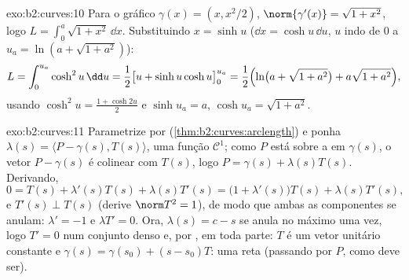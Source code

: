 \begin{solution}{exo:b2:curves:10}
Para o gráfico $\gamma(x) = (x, x^2/2)$, $\norm{\gamma'(x)} =
\sqrt{1 + x^2}$, logo $L = \int_0^a\sqrt{1+x^2}\,\dd x$.
Substituindo $x = \sinh u$ ($\dd x = \cosh u\,\dd u$, $u$ indo
de $0$ a $u_a = \ln(a + \sqrt{1+a^2})$):
\[
L = \int_0^{u_a}\cosh^2 u\,\dd u
= \frac12\bigl[u + \sinh u\cosh u\bigr]_0^{u_a}
= \frac12\Bigl(\ln\bigl(a + \sqrt{1+a^2}\bigr) +
a\sqrt{1+a^2}\Bigr),
\]
usando $\cosh^2 u = \frac{1 + \cosh 2u}2$ e $\sinh u_a = a$,
$\cosh u_a = \sqrt{1 + a^2}$.
\end{solution}

\begin{solution}{exo:b2:curves:11}
Parametrize por 
(\cref{thm:b2:curves:arclength}) e ponha $\lambda(s) =
\langle P - \gamma(s), T(s)\rangle$, uma função
$\mathcal C^1$; como $P$ está sobre a  em $\gamma(s)$,
o vetor $P - \gamma(s)$ é colinear com $T(s)$, logo $P =
\gamma(s) + \lambda(s)T(s)$. Derivando,
\[
0 = T(s) + \lambda'(s)T(s) + \lambda(s)T'(s)
= \bigl(1 + \lambda'(s)\bigr)T(s) + \lambda(s)T'(s),
\]
e $T'(s) \perp T(s)$ (derive $\norm T^2 = 1$), de modo que
ambas as componentes se anulam: $\lambda' = -1$ e $\lambda T' = 0$.
Ora, $\lambda(s) = c - s$ se anula no máximo uma vez, logo $T' = 0$
num conjunto denso e, por , em toda parte: $T$ é um
vetor unitário constante e $\gamma(s) = \gamma(s_0) + (s -
s_0)T$: uma reta (passando por $P$, como deve ser).
\end{solution}

